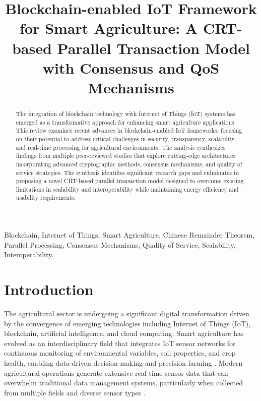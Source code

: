 \documentclass[12pt,onecolumn]{IEEEtran} %
\begin{document}
\title{Blockchain-enabled IoT Framework for Smart Agriculture: A CRT-based Parallel Transaction Model with Consensus and QoS Mechanisms}

\author{
}

\maketitle

\tableofcontents
\newpage

\begin{abstract}
The integration of blockchain technology with Internet of Things (IoT) systems has emerged as a transformative approach for enhancing smart agriculture applications. This review examines recent advances in blockchain-enabled IoT frameworks, focusing on their potential to address critical challenges in security, transparency, scalability, and real-time processing for agricultural environments. The analysis synthesizes findings from multiple peer-reviewed studies that explore cutting-edge architectures incorporating advanced cryptographic methods, consensus mechanisms, and quality of service strategies. The synthesis identifies significant research gaps and culminates in proposing a novel CRT-based parallel transaction model designed to overcome existing limitations in scalability and interoperability while maintaining energy efficiency and usability requirements.
\end{abstract}

\begin{IEEEkeywords}
Blockchain, Internet of Things, Smart Agriculture, Chinese Remainder Theorem, Parallel Processing, Consensus Mechanisms, Quality of Service, Scalability, Interoperability.
\end{IEEEkeywords}

\section{Introduction}
The agricultural sector is undergoing a significant digital transformation driven by the convergence of emerging technologies including Internet of Things (IoT), blockchain, artificial intelligence, and cloud computing. Smart agriculture has evolved as an interdisciplinary field that integrates IoT sensor networks for continuous monitoring of environmental variables, soil properties, and crop health, enabling data-driven decision-making and precision farming \cite{dhanaraju2022smartfarminginternet, akhter2022precisionagricultureusing}. Modern agricultural operations generate extensive real-time sensor data that can overwhelm traditional data management systems, particularly when collected from multiple fields and diverse sensor types \cite{huang2025digitaltraceabilityin, irfan2025aniotdrivensmart}.
\end{document}
